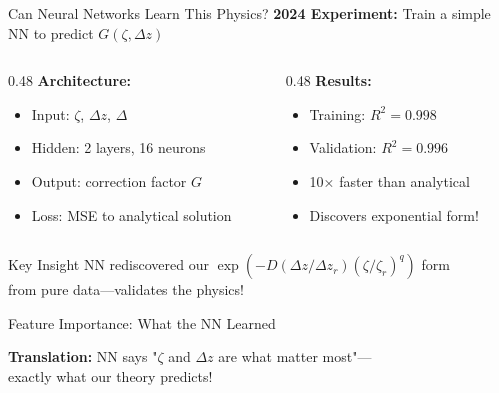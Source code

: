 \documentclass[10pt,aspectratio=169]{beamer}
\begin{document}
\begin{frame}{Can Neural Networks Learn This Physics?}
  \textbf{2024 Experiment:} Train a simple NN to predict $G(\zeta, \Delta z)$
  
  \vspace{0.3cm}
  \begin{columns}[T]
    \begin{column}{0.48\textwidth}
      \textbf{Architecture:}
      \begin{itemize}
        \item Input: $\zeta$, $\Delta z$, $\Delta$
        \item Hidden: 2 layers, 16 neurons
        \item Output: correction factor $G$
        \item Loss: MSE to analytical solution
      \end{itemize}
    \end{column}
    \begin{column}{0.48\textwidth}
      \textbf{Results:}
      \begin{itemize}
        \item Training: $R^2 = 0.998$
        \item Validation: $R^2 = 0.996$
        \item \alert{10× faster} than analytical
        \item Discovers exponential form!
      \end{itemize}
    \end{column}
  \end{columns}
  
  \vspace{0.5cm}
  \begin{exampleblock}{Key Insight}
    NN \alert{rediscovered} our $\exp(-D(\Delta z/\Delta z_r)(\zeta/\zeta_r)^q)$ form\\
    from pure data—validates the physics!
  \end{exampleblock}
\end{frame}

\begin{frame}{Feature Importance: What the NN Learned}
  \begin{center}
  \end{center}
  
  \textbf{Translation:} NN says "$\zeta$ and $\Delta z$ are what matter most"—\\
  exactly what our theory predicts!
\end{frame}
\end{document}
